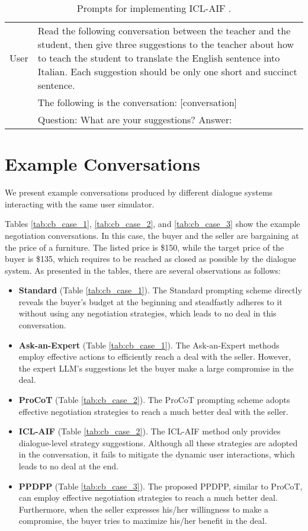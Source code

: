 \documentclass{article} %
\begin{document}
\begin{table}[h]
\begin{tabular}{lp{11cm}}
    \midrule
    User    &  Read the following conversation between the teacher and the student, then give three suggestions to the teacher about how to teach the student to translate the English sentence into Italian. Each suggestion should be only one short and succinct sentence.\\
    &The following is the conversation: [conversation]\\ 
    &Question: What are your suggestions? Answer: \\
    \bottomrule
    \end{tabular}
    \caption{Prompts for implementing ICL-AIF \citep{negotiate-selfplay}.}
    \label{tab:iclaif_prompt}
\end{table}





\clearpage
\section{Example Conversations}\label{app:case}
We present example conversations produced by different dialogue systems interacting with the same user simulator. 

Tables \ref{tab:cb_case_1}, \ref{tab:cb_case_2}, and \ref{tab:cb_case_3} show the example negotiation conversations. 
In this case, the buyer and the seller are bargaining at the price of a furniture. The listed price is \$150, while the target price of the buyer is \$135, which requires to be reached as closed as possible by the dialogue system. 
As presented in the tables, there are several observations as follows:
\begin{itemize}[leftmargin=*]
    \item \textbf{Standard} (Table \ref{tab:cb_case_1}). The Standard prompting scheme directly reveals the buyer's budget at the beginning and steadfastly adheres to it without using any negotiation strategies, which leads to no deal in this conversation. 
    \item \textbf{Ask-an-Expert} (Table \ref{tab:cb_case_1}). The Ask-an-Expert methods employ effective actions to efficiently reach a deal with the seller. However, the expert LLM's suggestions let the buyer make a large compromise in the deal. 
    \item \textbf{ProCoT} (Table \ref{tab:cb_case_2}). The ProCoT prompting scheme adopts effective negotiation strategies to reach a much better deal with the seller. 
    \item \textbf{ICL-AIF} (Table \ref{tab:cb_case_2}). The ICL-AIF method only provides dialogue-level strategy suggestions. Although all these strategies are adopted in the conversation, it fails to mitigate the dynamic user interactions, which leads to no deal at the end. 
    \item \textbf{PPDPP} (Table \ref{tab:cb_case_3}). The proposed PPDPP, similar to ProCoT, can employ effective negotiation strategies to reach a much better deal. Furthermore, when the seller expresses his/her willingness to make a compromise, the buyer tries to maximize his/her benefit in the deal. 
\end{itemize}
\end{document}
